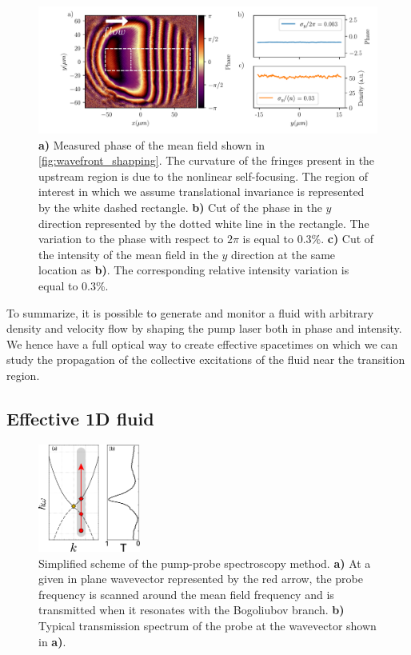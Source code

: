 \begin{figure}[h]
    \centering
    \includegraphics[width=1\textwidth]{chap_custom_st/fig/phase_example.pdf}
    \caption{\textbf{a)} Measured phase of the mean field shown in \autoref{fig:wavefront_shapping}. The curvature of the fringes present in the upstream region is due to the nonlinear self-focusing. The region
    of interest in which we assume translational invariance is represented by the white dashed rectangle. \textbf{b)}  Cut of the phase in the $y$ direction represented by the dotted white line in the rectangle. The variation to the phase with respect
    to $2\pi$ is equal to 0.3\%. \textbf{c)} Cut of the intensity of the mean field in the $y$ direction at the same location as \textbf{b)}. The corresponding relative intensity variation is equal to 0.3\%.}
    \label{fig:phase_example}
\end{figure}



To summarize, it is possible to generate and monitor a fluid with arbitrary density and velocity flow by shaping the pump laser both in phase and intensity. We hence have a full optical way to create
effective spacetimes on which we can study the propagation of the collective excitations of the fluid near the transition region.

\subsection{Effective 1D fluid}

\begin{figure}[h]
    \centering
    \includegraphics[width=0.3\textwidth]{chap_custom_st/fig/setup_bogoliubov.pdf}
    \caption{Simplified scheme of the pump-probe spectroscopy method. \textbf{a)} At a given in plane wavevector represented by the red arrow, the probe frequency is scanned around the mean field frequency and is transmitted when it resonates with the Bogoliubov branch. \textbf{b)} Typical transmission spectrum of the probe at the wavevector shown in \textbf{a)}.}
    \label{fig:setup_bogo}
\end{figure}

